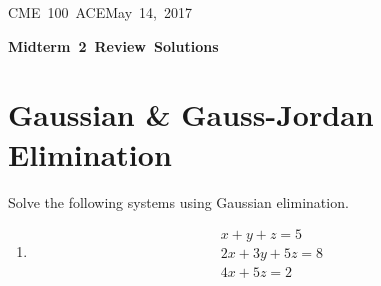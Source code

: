 \documentclass[letterpaper, 11pt]{article}
\makeatletter
\newcommand{\hmwkTitle}{Midterm\ 2\ Review\ Solutions} %
\newcommand{\hmwkClass}{CME\ 100\ ACE} %
\newcommand{\hmwkAuthorName}{T Anderson, S Messingher, A Kusimo} %
\newcommand{\hmwkAuthorEmail}{timmya@stanford.edu} %
\makeatother
\begin{document}
\noindent
\normalsize 
\hmwkClass \hfill May\ 14,\ 2017\\

\begin{center} \Large \textbf{\hmwkTitle} \end{center}

\section{Gaussian \& Gauss-Jordan Elimination}
Solve the following systems using Gaussian elimination. 
\begin{enumerate}
\item
\begin{gather*}
x + y + z = 5\\
2x + 3y + 5z = 8 \\
4x + 5z = 2 
\end{gather*}


\end{enumerate}
\end{document}
